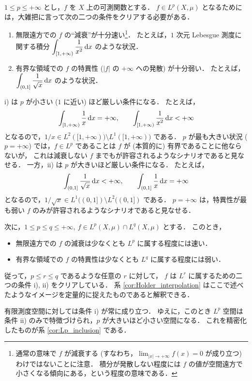 \begin{remark}
    $1\le p\le+\infty$ とし，$f$ を $X$ 上の可測関数とする．
    $f\in L^p(X,\mu)$ となるためには，大雑把に言って次の二つの条件をクリアする必要がある．
    \begin{enumerate}
        \item
            無限遠方での $f$ の``減衰''が十分速い\footnote{
                通常の意味で $f$ が減衰する (すなわち，$\lim_{|x|\to+\infty}f(x)=0$ が成り立つ) わけではないことに注意．
                積分が発散しない程度には $f$ の値が空間遠方で小さくなる傾向にある，という程度の意味である．
            }．
            たとえば，$1$ 次元 Lebesgue 測度に関する積分 $\displaystyle\int_{[1,+\infty)}\frac{1}{x^2}\,\mathrm{d} x$ のような状況．
        \item
            有界な領域での $f$ の特異性 ($|f|$ の $+\infty$ への発散) が十分弱い．
            たとえば，$\displaystyle\int_{(0,1]}\frac{1}{\sqrt x}\,\mathrm{d} x$ のような状況．
    \end{enumerate}
    \textrm{i)} は $p$ が小さい ($1$ に近い) ほど厳しい条件になる．
    たとえば，
    \begin{align*}
        \int_{[1,+\infty)}\frac{1}{x}\,\mathrm{d} x=+\infty,\qquad
        \int_{[1,+\infty)}\frac{1}{x^2}\,\mathrm{d} x<+\infty
    \end{align*}
    となるので，$1/x\in L^2([1,+\infty))\setminus L^1([1,+\infty))$ である．
    $p$ が最も大きい状況 ($p=+\infty$) では，$f\in L^p$ であることは $f$ が (本質的に) 有界であることに他ならないが，
    これは減衰しない $f$ までもが許容されるようなシナリオであると見なせる．
    一方，\textrm{ii)} は $p$ が大きいほど厳しい条件になる．
    たとえば，
    \begin{align*}
        \int_{(0,1]}\frac{1}{\sqrt x}\,\mathrm{d} x<+\infty,\qquad
        \int_{(0,1]}\frac{1}{x}\,\mathrm{d} x=+\infty
    \end{align*}
    となるので，$1/\sqrt x\in L^1((0,1])\setminus L^2((0,1])$ である．
    $p=+\infty$ は，特異性が最も弱い $f$ のみが許容されるようなシナリオであると見なせる．

    次に，$1\le p\le q\le+\infty,\ f\in L^p(X,\mu)\cap L^q(X,\mu)$ とする．
    このとき，
    \begin{itemize}
        \item 無限遠方での $f$ の減衰は少なくとも $L^p$ に属する程度には速い．
        \item 有界な領域での $f$ の特異性は少なくとも $L^q$ に属する程度には弱い．
    \end{itemize}
    従って，$p\le r\le q$ であるような任意の $r$ に対して，
    $f$ は $L^r$ に属するための二つの条件 \textrm{i)}, \textrm{ii)} をクリアしている．
    系 \ref{cor:Holder_interpolation} はここで述べたようなイメージを定量的に捉えたものであると解釈できる．

    有限測度空間に対しては条件 \textrm{i)} が常に成り立つ．
    ゆえに，このとき $L^p$ 空間は条件 \textrm{ii)} のみで特徴づけられ，$p$ が大きいほど小さい空間になる．
    これを精密化したものが系 \ref{cor:Lp_inclusion} である．
\end{remark}

